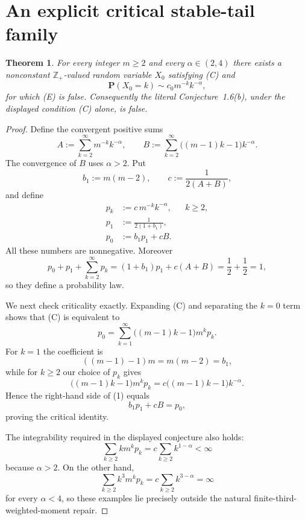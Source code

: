\documentclass[11pt]{article}
\newtheorem{theorem}{Theorem}
\begin{document}
\section{An explicit critical stable-tail family}

\begin{theorem}
For every integer $m\ge2$ and every $\alpha\in(2,4)$ there exists a nonconstant $\mathbb Z_+$-valued random variable $X_0$ satisfying \textup{(C)} and
\[
\mathbf P(X_0=k)\sim c_0m^{-k}k^{-\alpha},
\]
for which \textup{(E)} is false.  Consequently the literal Conjecture~1.6(b), under the displayed condition \textup{(C)} alone, is false.
\end{theorem}

\begin{proof}
Define the convergent positive sums
\[
A:=\sum_{k=2}^{\infty}m^{-k}k^{-\alpha},
\qquad
B:=\sum_{k=2}^{\infty}\bigl((m-1)k-1\bigr)k^{-\alpha}.
\]
The convergence of $B$ uses $\alpha>2$.  Put
\[
b_1:=m(m-2),\qquad c:=\frac1{2(A+B)},
\]
and define
\begin{align*}
p_k&:=c\,m^{-k}k^{-\alpha}, &&k\ge2,\\
p_1&:=\frac1{2(1+b_1)},\\
p_0&:=b_1p_1+cB.
\end{align*}
All these numbers are nonnegative.  Moreover
\[
p_0+p_1+\sum_{k=2}^{\infty}p_k
=(1+b_1)p_1+c(A+B)
=\frac12+\frac12=1,
\]
so they define a probability law.

We next check criticality exactly.  Expanding \textup{(C)} and separating the $k=0$ term shows that \textup{(C)} is equivalent to
\begin{equation}
p_0=\sum_{k=1}^{\infty}\bigl((m-1)k-1\bigr)m^kp_k.
\tag{1}
\end{equation}
For $k=1$ the coefficient is
\[
((m-1)-1)m=m(m-2)=b_1,
\]
while for $k\ge2$ our choice of $p_k$ gives
\[
\bigl((m-1)k-1\bigr)m^kp_k
=c\bigl((m-1)k-1\bigr)k^{-\alpha}.
\]
Hence the right-hand side of (1) equals
\[
b_1p_1+cB=p_0,
\]
proving the critical identity.

The integrability required in the displayed conjecture also holds:
\[
\sum_{k\ge2} k m^kp_k
=c\sum_{k\ge2}k^{1-\alpha}<\infty
\]
because $\alpha>2$.  On the other hand,
\[
\sum_{k\ge2} k^3m^kp_k
=c\sum_{k\ge2}k^{3-\alpha}=\infty
\]
for every $\alpha<4$, so these examples lie precisely outside the natural finite-third-weighted-moment repair.


\end{proof}
\end{document}
